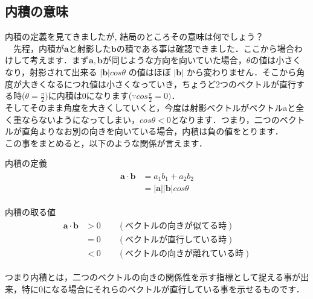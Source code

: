 \documentclass[11pt,a4paper]{jreport}
\begin{document}
\subsection{内積の意味}
内積の定義を見てきましたが, 結局のところその意味は何でしょう？\\
　先程，内積が$\mathbf{a}$と射影した$\mathbf{b}$の積である事は確認できました．ここから場合わけして考えます．まず$\mathbf{a,b}$が同じような方向を向いていた場合，$\theta$の値は小さくなり，射影されて出来る $|\mathbf{b}|cos\theta$ の値はほぼ $| \mathbf{b}|$ から変わりません．そこから角度が大きくなるにつれ値は小さくなっていき，ちょうど2つのベクトルが直行する時($\theta = \frac{\pi}{2})$に内積は0になります($\because cos\frac{\pi}{2}=0)$．\\

そしてそのまま角度を大きくしていくと，今度は射影ベクトルがベクトルaと全く重ならないようになってしまい，$cos\theta < 0$となります．つまり，二つのベクトルが直角よりなお別の向きを向いている場合，内積は負の値をとります．\\

この事をまとめると，以下のような関係が言えます．

\begin{screen}
内積の定義
\begin{eqnarray}
\begin{split}
\mathbf{a}\cdot\mathbf{b} &= a_1b_1 + a_2b_2\\
&= |\mathbf{a}||\mathbf{b}|cos\theta 
\end{split}
\end{eqnarray}

内積の取る値
\begin{eqnarray}
\begin{split}
\mathbf{a}\cdot \mathbf{b} &> 0 \qquad (ベクトルの向きが似てる時)\\
&=0 \qquad (ベクトルが直行している時)\\
&<0 \qquad (ベクトルの向きが離れている時)
\end{split}
\end{eqnarray}

\end{screen}

つまり内積とは，二つのベクトルの向きの関係性を示す指標として捉える事が出来，特に0になる場合にそれらのベクトルが直行している事を示せるものです．
\end{document}

